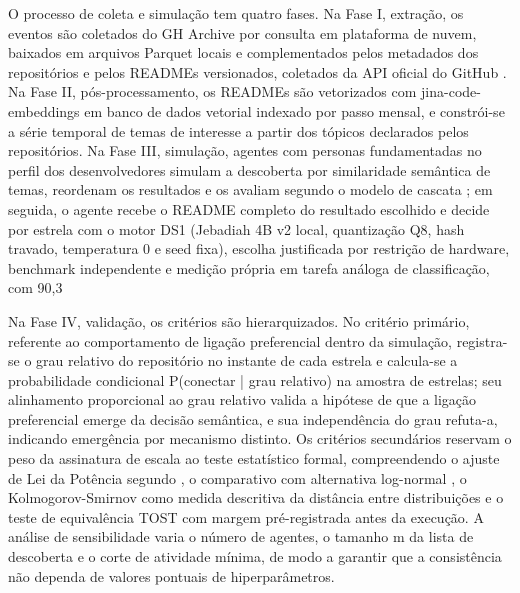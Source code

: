 \documentclass[12pt,oneside,a4paper,brazil,sumario=tradicional]{abntex2}
\begin{document}
O processo de coleta e simulação tem quatro fases. Na Fase I, extração, os eventos são coletados do GH Archive \parencite{grigorik_gharchive} por consulta em plataforma de nuvem, baixados em arquivos Parquet locais e complementados pelos metadados dos repositórios e pelos READMEs versionados, coletados da API oficial do GitHub \parencite{github2025}. Na Fase II, pós-processamento, os READMEs são vetorizados com jina-code-embeddings \parencite{kryvosheieva2025} em banco de dados vetorial indexado por passo mensal, e constrói-se a série temporal de temas de interesse a partir dos tópicos declarados pelos repositórios. Na Fase III, simulação, agentes com personas fundamentadas no perfil dos desenvolvedores \parencite{borges2018, stackoverflow2025} simulam a descoberta por similaridade semântica de temas, reordenam os resultados e os avaliam segundo o modelo de cascata \parencite{craswell2008}; em seguida, o agente recebe o README completo do resultado escolhido e decide por estrela com o motor DS1 (Jebadiah 4B v2 local, quantização Q8, hash travado, temperatura 0 e seed fixa), escolha justificada por restrição de hardware, benchmark independente e medição própria em tarefa análoga de classificação, com 90,3%

Na Fase IV, validação, os critérios são hierarquizados. No critério primário, referente ao comportamento de ligação preferencial dentro da simulação, registra-se o grau relativo do repositório no instante de cada estrela e calcula-se a probabilidade condicional P(conectar | grau relativo) na amostra de estrelas; seu alinhamento proporcional ao grau relativo valida a hipótese de que a ligação preferencial emerge da decisão semântica, e sua independência do grau refuta-a, indicando emergência por mecanismo distinto. Os critérios secundários reservam o peso da assinatura de escala ao teste estatístico formal, compreendendo o ajuste de Lei da Potência segundo \textcite{clauset2009}, o comparativo com alternativa log-normal \parencite{broido2019}, o Kolmogorov-Smirnov como medida descritiva da distância entre distribuições e o teste de equivalência TOST com margem pré-registrada antes da execução. A análise de sensibilidade varia o número de agentes, o tamanho m da lista de descoberta e o corte de atividade mínima, de modo a garantir que a consistência não dependa de valores pontuais de hiperparâmetros.
\end{document}
